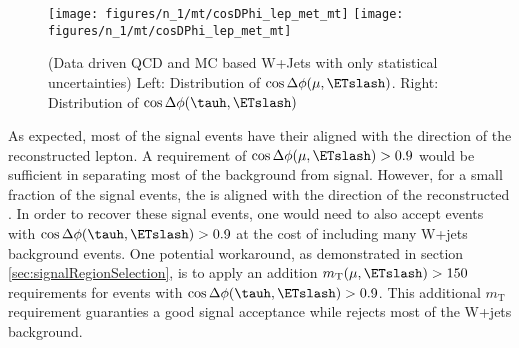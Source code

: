 \begin{figure}\centering
  \texttt{[image: figures/n\_1/mt/cosDPhi\_lep\_met\_mt]}
  \texttt{[image: figures/n\_1/mt/cosDPhi\_lep\_met\_mt]}
  \caption{\label{fig:selectionMotiviation_cosDPhi2} (Data driven QCD and MC based W+Jets with only statistical uncertainties) 
Left: Distribution of $\cos{\Delta \phi (\mu,\ETslash)}$. Right: Distribution of 
$\cos{\Delta \phi (\tauh,\ETslash)}$}
\end{figure}

As expected, most of the signal events have their \ETslash aligned with the direction of 
the reconstructed lepton. A requirement of $\cos{\Delta \phi (\mu,\ETslash)} > 0.9$ would 
be sufficient in separating most of the background from signal. However, for a small 
fraction of the signal events, the \ETslash is aligned with the direction of the reconstructed 
\tauh. In order to recover these signal events, one would need to also accept events with 
$\cos{\Delta \phi (\tauh,\ETslash)} > 0.9$ at the cost of including many W+jets background 
events. One potential workaround, as demonstrated in section \ref{sec:signalRegionSelection}, 
is to apply an addition $m_{\text{T}}(\mu,\ETslash) > 150$ requirements for events with 
$\cos{\Delta \phi (\tauh,\ETslash)} > 0.9$. This additional $m_{\text{T}}$ requirement 
guaranties a good signal acceptance while rejects most of the W+jets background.

